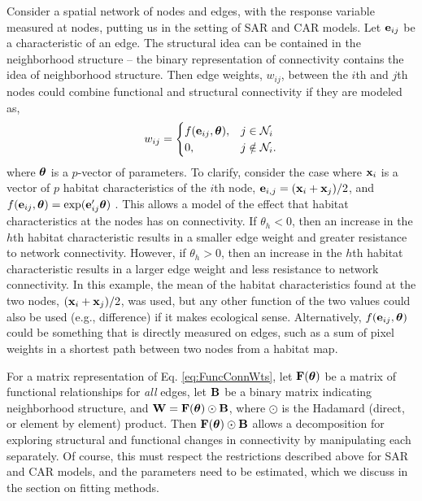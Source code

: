 \documentclass[11pt, titlepage]{article}\usepackage[]{graphicx}\usepackage[]{color}
\begin{document}
\begin{spacing}{1.9}
\begin{flushleft}
Consider a spatial network of nodes and edges, with the response variable measured at nodes, putting us in the setting of SAR and CAR models.  Let $\mathbf{e}_{ij}$ be a characteristic of an edge. The structural idea can be contained in the neighborhood structure -- the binary representation of connectivity contains the idea of neighborhood structure. Then edge weights, $w_{ij}$, between the $i$th and $j$th nodes could combine functional and structural connectivity if they are modeled as,
\begin{equation} \label{eq:FuncConnWts}
   w_{ij}= \begin{cases}
     f(\mathbf{e}_{ij}, \mbox{\boldmath $\theta$}), & j \in \mathcal{N}_i \\
            0, & j \notin \mathcal{N}_i. \\
    \end{cases}
\end{equation}
where $\mbox{\boldmath $\theta$}$ is a $p$-vector of parameters.  To clarify, consider the case where $\mathbf{x}_i$ is a vector of $p$ habitat characteristics of the $i$th node, $\mathbf{e}_{i,j} = (\mathbf{x}_i +\mathbf{x}_j)/2$, and $f(\mathbf{e}_{ij},\mbox{\boldmath $\theta$}) = \exp(\mathbf{e}^{\prime}_{ij}\mbox{\boldmath $\theta$})$ \citep{Hank:Hoot:circ:2013}. This allows a model of the effect that habitat characteristics at the nodes has on connectivity. If $\theta_h < 0$, then an increase in the $h$th habitat characteristic results in a smaller edge weight and greater resistance to network connectivity. However, if $\theta_h > 0$, then an increase in the $h$th habitat characteristic results in a larger edge weight and less resistance to network connectivity. In this example, the mean of the habitat characteristics found at the two nodes, $(\mathbf{x}_i +\mathbf{x}_j)/2$, was used, but any other function of the two values could also be used (e.g., difference) if it makes ecological sense.  Alternatively, $f(\mathbf{e}_{ij},\mbox{\boldmath $\theta$})$ could be something that is directly measured on edges, such as a sum of pixel weights in a shortest path between two nodes from a habitat map.   

For a matrix representation of Eq. \ref{eq:FuncConnWts}, let $\mathbf{F}(\mbox{\boldmath $\theta$})$ be a matrix of functional relationships for \textit{all} edges, let $\mathbf{B}$ be a binary matrix indicating neighborhood structure, and $\mathbf{W} = \mathbf{F}(\mbox{\boldmath $\theta$}) \odot \mathbf{B}$, where $\odot$ is the Hadamard (direct, or element by element) product. Then $\mathbf{F}(\mbox{\boldmath $\theta$}) \odot \mathbf{B}$ allows a decomposition for exploring structural and functional changes in connectivity by manipulating each separately. Of course, this must respect the restrictions described above for SAR and CAR models, and the parameters need to be estimated, which we discuss in the section on fitting methods.


\end{flushleft}
\end{spacing}
\end{document}
